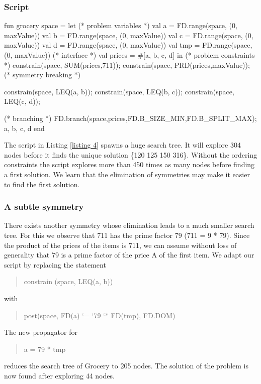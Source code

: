 \documentclass[a4paper,halfparskip]{scrartcl}
\begin{document}
\subsubsection{Script}
\begin{myverbatim}
fun grocery space =
   let
      (* problem variables *)
      val a = FD.range(space, (0, maxValue))
      val b = FD.range(space, (0, maxValue))
      val c = FD.range(space, (0, maxValue))
      val d = FD.range(space, (0, maxValue))
      val tmp = FD.range(space,(0, maxValue))
      (* interface *)
      val prices = #[a, b, c, d]
   in
      (* problem constraints *)
      constrain(space, SUM(prices,711));
      constrain(space, PRD(prices,maxValue));
      (* symmetry breaking *)
      
      constrain(space, LEQ(a, b));
      constrain(space, LEQ(b, c));
      constrain(space, LEQ(c, d));
      
      (* branching *)
      FD.branch(space,prices,FD.B_SIZE_MIN,FD.B_SPLIT_MAX);
      {a, b, c, d}
   end
\end{myverbatim}


The script in Listing \ref{listing 4} spawns a huge search tree. 
It will explore 
304 nodes before it finds the unique solution \{120 125 150 316\}.
 Without the ordering constraints 
the script explores more than 450 times as many nodes before
 finding a first solution. 
We learn that the elimination of symmetries may make it easier 
to find the first solution.


\subsubsection{A subtle symmetry}
There exists another symmetry whose elimination leads to a much smaller search tree. 
For this we observe that 711 has the prime factor 79 (711 = 9 * 79). Since the product 
of the prices of the items is 711, we can assume without loss of generality that 79 is 
a prime factor of the price A of the first item. We adapt our script by replacing 
the statement 
\begin{quote}
constrain (space, LEQ(a, b)) 
\end{quote}
with
\begin{quote}
post(space, FD(a) `=  `79  `*  FD(tmp), FD.DOM)
\end{quote}
The new propagator for 
\begin{quote}
a = 79 * tmp
\end{quote} 
reduces the search tree of Grocery to 205 nodes. 
The solution of the problem is now found after exploring 44 nodes.
\end{document}
